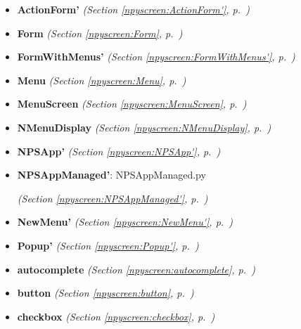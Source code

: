 \begin{itemize}
\setlength{\parskip}{0ex}
\item \textbf{ActionForm'}
  \textit{(Section \ref{npyscreen:ActionForm'}, p.~\pageref{npyscreen:ActionForm'})}

\item \textbf{Form}
  \textit{(Section \ref{npyscreen:Form}, p.~\pageref{npyscreen:Form})}

\item \textbf{FormWithMenus'}
  \textit{(Section \ref{npyscreen:FormWithMenus'}, p.~\pageref{npyscreen:FormWithMenus'})}

\item \textbf{Menu}
  \textit{(Section \ref{npyscreen:Menu}, p.~\pageref{npyscreen:Menu})}

\item \textbf{MenuScreen}
  \textit{(Section \ref{npyscreen:MenuScreen}, p.~\pageref{npyscreen:MenuScreen})}

\item \textbf{NMenuDisplay}
  \textit{(Section \ref{npyscreen:NMenuDisplay}, p.~\pageref{npyscreen:NMenuDisplay})}

\item \textbf{NPSApp'}
  \textit{(Section \ref{npyscreen:NPSApp'}, p.~\pageref{npyscreen:NPSApp'})}

\item \textbf{NPSAppManaged'}: NPSAppManaged.py



  \textit{(Section \ref{npyscreen:NPSAppManaged'}, p.~\pageref{npyscreen:NPSAppManaged'})}

\item \textbf{NewMenu'}
  \textit{(Section \ref{npyscreen:NewMenu'}, p.~\pageref{npyscreen:NewMenu'})}

\item \textbf{Popup'}
  \textit{(Section \ref{npyscreen:Popup'}, p.~\pageref{npyscreen:Popup'})}

\item \textbf{autocomplete}
  \textit{(Section \ref{npyscreen:autocomplete}, p.~\pageref{npyscreen:autocomplete})}

\item \textbf{button}
  \textit{(Section \ref{npyscreen:button}, p.~\pageref{npyscreen:button})}

\item \textbf{checkbox}
  \textit{(Section \ref{npyscreen:checkbox}, p.~\pageref{npyscreen:checkbox})}


\end{itemize}
